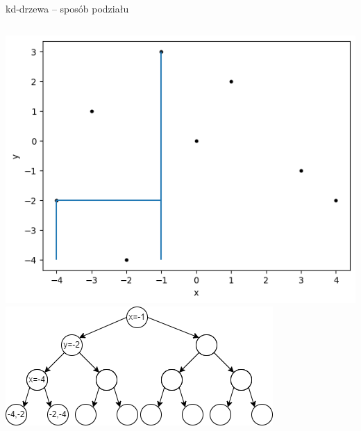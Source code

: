 \documentclass[aspectratio=169,dvipsnames]{beamer}
\begin{document}
\begin{frame}{kd-drzewa -- sposób podziału}
    \begin{columns}
        \includegraphics[width=\textwidth]{images/plots/4}
        \includegraphics[width=\textwidth]{images/trees/5.drawio}
    \end{columns}
\end{frame}
\end{document}
